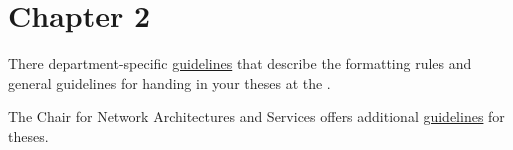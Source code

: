 \chapter{Chapter 2}
\label{chap:chaptertwo}

There department-specific \href{https://www.in.tum.de/en/current-students/administrative-matters/thesis-guidelines-and-topics/}{\textcolor{TUMBlue}{guidelines}} that describe the formatting rules and general guidelines for handing in your theses at the \school.

The Chair for Network Architectures and Services offers additional \href{https://net.in.tum.de/theses/guidelines.pdf}{\textcolor{TUMBlue}{guidelines}} for theses.
